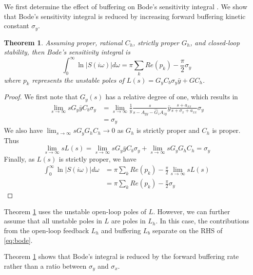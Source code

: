 \documentclass[letterpaper, 10 pt,  conference]{ieeeconf}  %
\newtheorem{theorem}{Theorem}
\begin{document}
We first determine the effect of buffering on Bode's sensitivity integral \cite{SKOP05,SERBG97,ASTM08}. We show that Bode's sensitivity integral is reduced by increasing forward buffering kinetic constant $\sigma_y$.
\begin{theorem}\label{th:bode}
Assuming proper, rational $C_h$, strictly proper $G_h$, and closed-loop stability, then Bode's sensitivity integral is
\begin{equation}\label{eq:bode}
\int_0^\infty \ln|S(i\omega)|d\omega = \pi\sum_k Re(p_k)-\frac{\pi}{2}\sigma_y
\end{equation}
where $p_k$ represents the unstable poles of $L(s)= G_yC_b \sigma_y\bar{y}+GC_h$.
\end{theorem}
\begin{proof}
We first note that $G_y(s)$ has a relative degree of one, which results in 
\begin{equation*}
\begin{aligned}
\lim_{s\to\infty} s G_y\bar{y}C_b \sigma_y&=\lim_{s\to\infty} \frac{1}{\bar{y}}\frac{s}{s-A_{yy}-\hat G_zA_{zy}}\bar{y}\frac{s+a_{xx}}{s+\sigma_x+a_{xx}}\sigma_y\\
&=\sigma_y
\end{aligned}
\end{equation*}
We also have $\lim_{s\to\infty} s G_yG_hC_h\to 0$ as $G_h$ is strictly proper and $C_h$ is proper. Thus
\begin{equation*}
\lim_{s\to\infty}sL(s)= \lim_{s\to\infty}sG_y\bar{y}C_b\sigma_y+\lim_{s\to\infty}sG_y G_hC_h=\sigma_y
\end{equation*}
Finally, as $L(s)$ is strictly proper, we have \cite{SERBG97}
\begin{equation*}
\begin{aligned}
\int_0^\infty \ln|S(i\omega)|d\omega &= \pi\sum_k Re(p_k)-\frac{\pi}{2} \lim_{s\to\infty}sL(s)\\
&=\pi\sum_k Re(p_k)-\frac{\pi}{2}\sigma_y
\end{aligned}
\end{equation*}
\end{proof}
Theorem \ref{th:bode} uses the unstable open-loop poles of $L$. However, we can further assume that all unstable poles in $L$ are poles in $L_h$. In this case, the contributions from the open-loop feedback $L_h$ and buffering $L_b$ separate on the RHS of \eqref{eq:bode}.

Theorem \ref{th:bode} shows that Bode's integral is reduced by the forward buffering rate rather than a ratio between $\sigma_y$ and $\sigma_x$.
\end{document}
